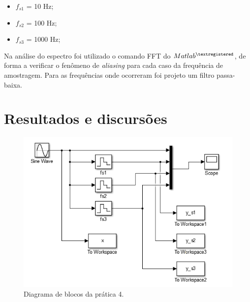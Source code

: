 \begin{itemize}
	\item $f_{s1}$ = 10 Hz;
	\item $f_{s2}$ = 100 Hz;
	\item $f_{s3}$ = 1000 Hz; 
\end{itemize}

Na análise do espectro foi utilizado o comando FFT do $Matlab^{\textregistered}$, de forma a verificar o fenômeno de \textit{aliasing}	 para cada caso da frequência de amostragem. Para as frequências onde ocorreram  foi projeto um filtro passa-baixa.


\section{Resultados e discursões}

\begin{figure}[!th]
	\centering
	\includegraphics[scale = .7]{Imagens/pratica4_1.PNG}
	\caption{Diagrama de blocos da prática 4.}
	\label{fig:pr4_esquema}
\end{figure}

